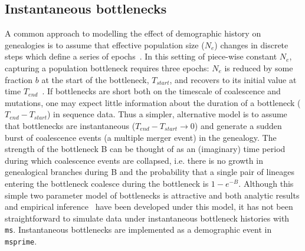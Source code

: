 \documentclass{article}
\newcommand{\msprime}[0]{\texttt{msprime}}
\newcommand{\ms}[0]{\texttt{ms}}
\begin{document}
\begin{comment}
Previous draft of the ARG feature retained here as a comment.

The definition of ARGs is vague and confusing.
\cite{minichiello2006mapping} define it as the data structure
rather than the original stochastic
process~\citep{griffiths1991two,griffiths1997ancestral}.
\cite{rasmussen2014genome} have a slightly different approach.
Sometimes the ARG is useful.
The tree sequence output for \msprime\ can be turned into
an ARG using the \texttt{record\_full\_arg} option, where we store
recombination nodes.

We also provide an interface to compute the likelihood of a given ARG
under the~\cite{kuhner2000maximum} model.
\end{comment}

\subsection*{Instantaneous bottlenecks}
A common approach to modelling the effect of demographic history on genealogies is to assume that effective population size ($N_e$) changes in discrete steps which define a series of epochs~\citep{griffiths1994sampling, marth2004allele, keightley2007joint, li2011inference}. In this setting of piece-wise constant $N_e$, capturing a population bottleneck requires three epochs: $N_e$ is reduced by some fraction $b$ at the start of the bottleneck, $T_{start}$, and recovers to its initial value at time $T_{end}$~\citep{marth2004allele}. If bottlenecks are short both on the timescale of coalescence and mutations, one may expect little information about the duration of a bottleneck ($T_{end}-T_{start}$) in sequence data. Thus a simpler, alternative model is to assume that bottlenecks are instantaneous ($T_{end}-T_{start} \rightarrow 0$) and generate a sudden burst of coalescence events (a multiple merger event) in the genealogy. The strength of the bottleneck B can be thought of as an (imaginary) time period during which coalescence events are collapsed, i.e. there is no growth in genealogical branches during B and the probability that a single pair of lineages entering the bottleneck coalesce during the bottleneck is $1-e^{-B}$. Although this simple two parameter model of bottlenecks is attractive and both analytic results and empirical inference~\citep{griffiths1994sampling, galtier2000detecting, bunnefeld2015inferring} have been developed under this model, it has not been straightforward to simulate data under instantaneous bottleneck histories with \ms. Instantaneous bottlenecks are implemented as a demographic event in \msprime.
\end{document}
